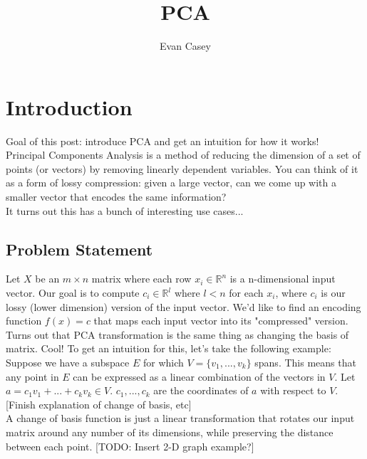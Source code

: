 \documentclass[11pt]{article}
\theoremstyle{plain}
\theoremstyle{definition}
\begin{document}
\title{PCA}
\author{Evan Casey}
\maketitle

\section{Introduction}

Goal of this post: introduce PCA and get an intuition for how it works!
\\

Principal Components Analysis is a method of reducing the dimension of a set of points (or vectors) by removing linearly dependent variables. You can think of it as a form of lossy compression: given a large vector, can we come up with a smaller vector that encodes the same information?
\\

It turns out this has a bunch of interesting use cases...


\subsection{Problem Statement}

Let $X$ be an $m \times n$ matrix where each row $x_i \in \mathbb{R}^n$ is a n-dimensional input vector. Our goal is to compute $c_i \in \mathbb{R}^l$ where $l < n$ for each $x_i$, where $c_i$ is our lossy (lower dimension) version of the input vector. We'd like to find an encoding function $f(x) = c$ that maps each input vector into its "compressed" version.
\\

Turns out that PCA transformation is the same thing as changing the basis of matrix. Cool! To get an intuition for this, let's take the following example:
\\

Suppose we have a subspace $E$ for which $V = \{v_{1}, ...,v_{k}\}$ spans. This means that any point in $E$ can be expressed as a linear combination of the vectors in $V$. Let $a = c_1v_1 + ... + c_kv_k \in V$. $c_1,...,c_k$ are the coordinates of $a$ with respect to $V$. 
\\

[Finish explanation of change of basis, etc]
\\

A change of basis function is just a linear transformation that rotates our input matrix around any number of its dimensions, while preserving the distance between each point. [TODO: Insert 2-D graph example?]
\\
\end{document}

